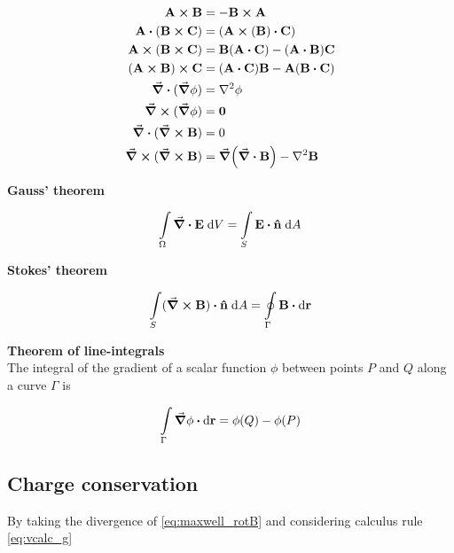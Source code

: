 \begin{subequations}
\label{eq:vcalc}
\begin{align}
\vb{A} \cross \vb{B} &= - \vb{B} \cross \vb{A} \label{eq:vcalc_a}\\
\vb{A} \vdot (\vb{B} \cross \vb{C}) &= (\vb{A} \cross (\vb{B}) \vdot \vb{C}) \label{eq:vcalc_b}\\
\vb{A} \cross (\vb{B} \cross \vb{C}) &= \vb{B} (\vb{A} \vdot \vb{C}) - (\vb{A} \vdot \vb{B})\vb{C} \label{eq:vcalc_c}\\
(\vb{A} \cross \vb{B}) \cross \vb{C} &= (\vb{A} \vdot \vb{C}) \vb{B} - \vb{A} (\vb{B} \vdot \vb{C}) \label{eq:vcalc_d}\\
\div{(\grad{\phi})} &= \laplacian{\phi} \label{eq:vcalc_e}\\
\curl{(\grad{\phi})} &= \vb{0} \label{eq:vcalc_f}\\
\div{(\curl{\vb{B}})} &= 0 \label{eq:vcalc_g}\\
\curl{(\curl{\vb{B}})} &= \grad(\div{\vb{B}}) - \laplacian{\vb{B}}  \label{eq:vcalc_h}
\end{align}
\end{subequations}

\textbf{Gauss' theorem}

\begin{equation}
\int\limits_{\Omega}\div{\vb{E}} \; \mathrm{d}V = \int\limits_{S}\vb{E} \vdot \vu{n} \; \mathrm{d}A \label{eq:Gauss}
\end{equation}

\textbf{Stokes' theorem}

\begin{equation}
\int\limits_{S}(\curl{\vb{B}}) \vdot \vu{n} \; \mathrm{d}A = \oint\limits_{\Gamma} \vb{B} \vdot \mathrm{d}\vb{r}  \label{eq:Stokes}
\end{equation}

\textbf{Theorem of line-integrals}\\
The integral of the gradient of a scalar function $\phi$ between points $P$ and $Q$ along a curve $\Gamma$ is
  
\begin{equation*}
\int\limits_{\Gamma} \grad{\phi} \vdot \mathrm{d}\vb{r} = \phi(Q) - \phi(P)  \label{eq:LineInt}
\end{equation*}


\subsection*{Charge conservation}
By taking the divergence of \ref{eq:maxwell_rotB} and considering calculus rule \ref{eq:vcalc_g}

